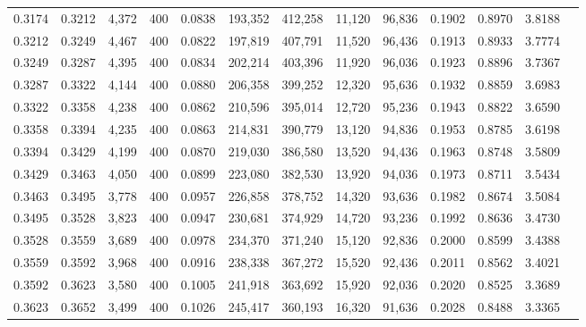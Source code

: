 \begin{tabular}{rrrrrrrrrrrrr}
0.3174 & 0.3212 &  4,372 & 400 &                                     0.0838 & 193,352 & 412,258 &  11,120 &  96,836 & 0.1902 & 0.8970 & 3.8188 \\
0.3212 & 0.3249 &  4,467 & 400 &                                     0.0822 & 197,819 & 407,791 &  11,520 &  96,436 & 0.1913 & 0.8933 & 3.7774 \\
0.3249 & 0.3287 &  4,395 & 400 &                                     0.0834 & 202,214 & 403,396 &  11,920 &  96,036 & 0.1923 & 0.8896 & 3.7367 \\
0.3287 & 0.3322 &  4,144 & 400 &                                     0.0880 & 206,358 & 399,252 &  12,320 &  95,636 & 0.1932 & 0.8859 & 3.6983 \\
0.3322 & 0.3358 &  4,238 & 400 &                                     0.0862 & 210,596 & 395,014 &  12,720 &  95,236 & 0.1943 & 0.8822 & 3.6590 \\
0.3358 & 0.3394 &  4,235 & 400 &                                     0.0863 & 214,831 & 390,779 &  13,120 &  94,836 & 0.1953 & 0.8785 & 3.6198 \\
0.3394 & 0.3429 &  4,199 & 400 &                                     0.0870 & 219,030 & 386,580 &  13,520 &  94,436 & 0.1963 & 0.8748 & 3.5809 \\
0.3429 & 0.3463 &  4,050 & 400 &                                     0.0899 & 223,080 & 382,530 &  13,920 &  94,036 & 0.1973 & 0.8711 & 3.5434 \\
0.3463 & 0.3495 &  3,778 & 400 &                                     0.0957 & 226,858 & 378,752 &  14,320 &  93,636 & 0.1982 & 0.8674 & 3.5084 \\
0.3495 & 0.3528 &  3,823 & 400 &                                     0.0947 & 230,681 & 374,929 &  14,720 &  93,236 & 0.1992 & 0.8636 & 3.4730 \\
0.3528 & 0.3559 &  3,689 & 400 &                                     0.0978 & 234,370 & 371,240 &  15,120 &  92,836 & 0.2000 & 0.8599 & 3.4388 \\
0.3559 & 0.3592 &  3,968 & 400 &                                     0.0916 & 238,338 & 367,272 &  15,520 &  92,436 & 0.2011 & 0.8562 & 3.4021 \\
0.3592 & 0.3623 &  3,580 & 400 &                                     0.1005 & 241,918 & 363,692 &  15,920 &  92,036 & 0.2020 & 0.8525 & 3.3689 \\
0.3623 & 0.3652 &  3,499 & 400 &                                     0.1026 & 245,417 & 360,193 &  16,320 &  91,636 & 0.2028 & 0.8488 & 3.3365 \\

\end{tabular}
